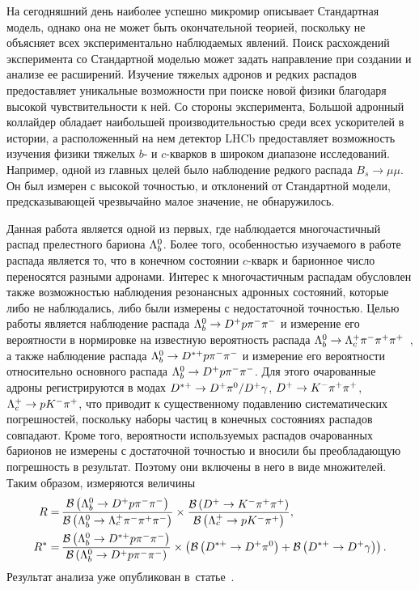 \clearpage
{}

На сегодняшний день наиболее успешно микромир описывает Стандартная 
модель, однако она не может быть окончательной теорией, поскольку не 
объясняет всех экспериментально наблюдаемых явлений.  Поиск расхождений 
эксперимента со Стандартной моделью может задать направление при 
создании и анализе ее расширений.  Изучение тяжелых адронов и редких 
распадов предоставляет уникальные возможности при поиске новой физики 
благодаря высокой чувствительности к ней.  Со стороны эксперимента, 
Большой адронный коллайдер обладает наибольшей производительностью среди 
всех ускорителей в истории, а расположенный на нем детектор LHCb 
предоставляет возможность изучения физики тяжелых $b$- и $c$-кварков 
в широком диапазоне исследований.  Например, одной из главных целей было 
наблюдение редкого распада $ B_s \to \mu\mu $. Он был измерен с высокой 
точностью, и отклонений от Стандартной модели, предсказывающей 
чрезвычайно малое значение, не обнаружилось.

Данная работа является одной из первых, где наблюдается многочастичный 
распад прелестного бариона ${\Lambda_b^0}$. Более того, особенностью изучаемого 
в работе распада является то, что в конечном состоянии $c$-кварк 
и барионное число переносятся разными адронами.  Интерес 
к многочастичным распадам обусловлен также возможностью наблюдения 
резонансных адронных состояний, которые либо не наблюдались, либо были 
измерены с недостаточной точностью.  Целью работы является наблюдение 
распада $\Lb\to\Dp\p\pim\pim$ и измерение его вероятности в нормировке 
на известную вероятность распада 
$\Lb\to\Lc\pim\pip\pip$~\cite{lb2lc3pi-lhcb,lb2lc3pi-cdf}, а также 
наблюдение распада $\Lb\to\Dstarp\p\pim\pim$ и измерение его вероятности 
относительно основного распада $\Lb\to\Dp\p\pim\pim$.  Для этого 
очарованные адроны регистрируются в модах $\Dstarp\to\Dp\piz/\Dp\gamma$, 
$\Dp\to\Km\pip\pip$, $\Lc\to\p\Km\pip$, что приводит к существенному 
подавлению систематических погрешностей, поскольку наборы частиц 
в конечных состояниях распадов совпадают. Кроме того, вероятности 
используемых распадов очарованных барионов не измерены с достаточной 
точностью и вносили бы преобладающую погрешность в результат. Поэтому 
они включены в него в виде множителей.  Таким образом, измеряются 
величины
%
\[\begin{aligned}
  R =&\, \frac{\BR{\Lb\to\Dp\p\pim\pim}}{\BR{\Lb\to\Lc\pim\pip\pim}} \times
	\frac{\BR{\Dp\to\Km\pip\pip}}{\BR{\Lc\to\p\Km\pip}} ,\\
R^* =&\, \frac{\BR{\Lb\to\Dstarp\p\pim\pim}}{\BR{\Lb\to\Dp\p\pim\pim}} \times
	\left( \BR{\Dstarp\to\Dp\piz} + \BR{\Dstarp\to\Dp\gamma} \right) .\\
\end{aligned}\]
%
Результат анализа уже опубликован в~статье~\cite{lb2dppipi-paper}.

